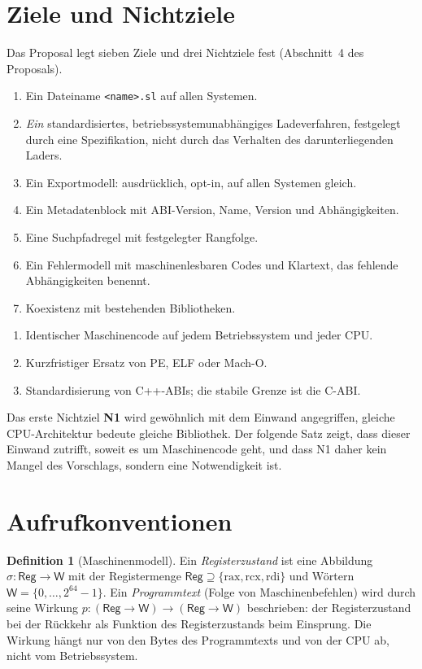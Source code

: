 \documentclass[a4paper,12pt,twoside]{report}
\DeclareRobustCommand{\_}{\ifmmode\mbox{\textunderscore}\else\textunderscore\allowbreak{}\fi}
\theoremstyle{definition}
\newtheorem{definition}{Definition}[chapter]
\begin{document}
\section{Ziele und Nichtziele}

Das Proposal legt sieben Ziele und drei Nichtziele fest (Abschnitt~4 des Proposals).

\begin{enumerate}[label=\textbf{Z\arabic*}]
	\item Ein Dateiname \texttt{<name>.sl} auf allen Systemen.
	\item \emph{Ein} standardisiertes, betriebssystemunabhängiges Ladeverfahren, festgelegt durch eine Spezifikation, nicht durch das Verhalten des darunterliegenden Laders.
	\item Ein Exportmodell: ausdrücklich, opt-in, auf allen Systemen gleich.
	\item Ein Metadatenblock mit ABI-Version, Name, Version und Abhängigkeiten.
	\item Eine Suchpfadregel mit festgelegter Rangfolge.
	\item Ein Fehlermodell mit maschinenlesbaren Codes und Klartext, das fehlende Abhängigkeiten benennt.
	\item Koexistenz mit bestehenden Bibliotheken.
\end{enumerate}

\begin{enumerate}[label=\textbf{N\arabic*}]
	\item Identischer Maschinencode auf jedem Betriebssystem und jeder CPU.
	\item Kurzfristiger Ersatz von PE, ELF oder Mach-O.
	\item Standardisierung von C++-ABIs; die stabile Grenze ist die C-ABI.
\end{enumerate}

Das erste Nichtziel \textbf{N1} wird gewöhnlich mit dem Einwand angegriffen, gleiche CPU-Architektur bedeute gleiche Bibliothek. Der folgende Satz zeigt, dass dieser Einwand zutrifft, soweit es um Maschinencode geht, und dass N1 daher kein Mangel des Vorschlags, sondern eine Notwendigkeit ist.

\section{Aufrufkonventionen}
\label{sec:abi}

\begin{definition}[Maschinenmodell]
	Ein \emph{Registerzustand} ist eine Abbildung $\sigma:\mathsf{Reg}\to\mathsf{W}$ mit der Registermenge $\mathsf{Reg}\supseteq\{\mathrm{rax},\mathrm{rcx},\mathrm{rdi}\}$ und Wörtern $\mathsf W=\{0,\ldots,2^{64}-1\}$. Ein \emph{Programmtext} (Folge von Maschinenbefehlen) wird durch seine Wirkung $p:(\mathsf{Reg}\to\mathsf W)\to(\mathsf{Reg}\to\mathsf W)$ beschrieben: der Registerzustand bei der Rückkehr als Funktion des Registerzustands beim Einsprung. Die Wirkung hängt nur von den Bytes des Programmtexts und von der CPU ab, nicht vom Betriebssystem.
\end{definition}
\end{document}
